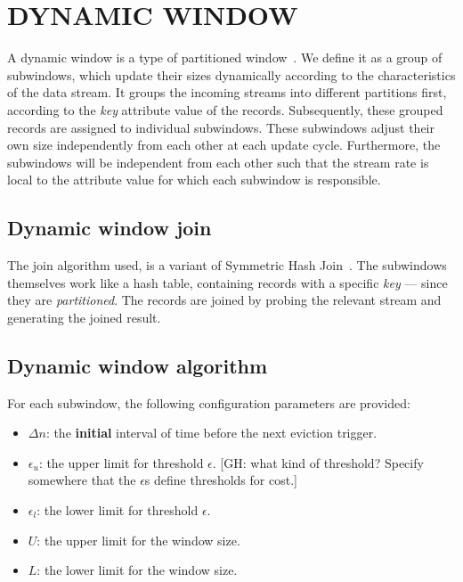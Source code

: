 \section{DYNAMIC WINDOW}%
\label{sec:Dynamic Window}
A dynamic window is a type of partitioned window~\cite{generic_window_sem}.
We define it as a group of subwindows, which update their sizes dynamically according to the characteristics 
of the data stream. It groups the incoming streams into different partitions first, according to 
the \emph{key} attribute value of the records. Subsequently, these grouped records are assigned 
to individual subwindows. These subwindows adjust their own size independently from each other 
at each update cycle. Furthermore, the subwindows will be independent from each other such 
that the stream rate is local to the attribute value for which each subwindow is responsible. 

\subsection{Dynamic window join}
\label{sub:Dynamic window join}

The join algorithm used, is a variant of Symmetric Hash Join~\cite{symmetric_hash_join}. 
The subwindows themselves work like a hash table, containing records with a 
specific \emph{key} --- since they are \emph{partitioned}. 
The records are joined by probing the relevant stream and generating the 
joined result. 


\subsection{Dynamic window algorithm}%
\label{sub:Dynamic window algorithm}
For each subwindow, the following configuration parameters 
are provided: 

\begin{itemize}
    \item $\Delta n$: the \textbf{initial} interval of time before the next eviction trigger. 
    \item $\epsilon_u$: the upper limit for threshold $\epsilon$.
    [GH: what kind of threshold? Specify somewhere that  the $\epsilon$s define thresholds for cost.]
    \item $\epsilon_l$: the lower limit for threshold $\epsilon$. 
    \item $U$: the upper limit for the window size. 
    \item $L$: the lower limit for the window size. 
\end{itemize}

